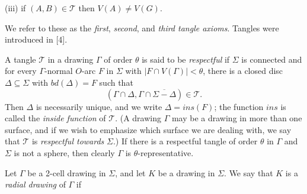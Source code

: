 \hspace*{12pt}(iii) if $(A, B) \in \mathscr{T}$ then $V(A) \ne V(G)$.

We refer to these as the \textit{first}, \textit{second}, and \textit{third tangle axioms}. Tangles were introduced in [4].

A tangle $\mathscr{T}$ in a drawing $\Gamma$ of order $\theta$ is said to be \textit{respectful} if $\Sigma$ is connected and for every $\Gamma$-normal $O$-arc $F$ in $\Sigma$ with $|F \cap V(\Gamma)| < \theta$, there is a closed disc $\Delta \subseteq \Sigma$ with $bd(\Delta) = F$ such that
\begin{equation*}
(\Gamma \cap \Delta, \Gamma \cap \overline{\Sigma - \Delta}) \in \mathscr{T}.
\end{equation*}
Then $\Delta$ is necessarily unique, and we write $\Delta = ins(F)$; the function $ins$ is called the \textit{inside function} of $\mathscr{T}$. (A drawing $\Gamma$ may be a drawing in more than one surface, and if we wish to emphasize which surface we are dealing with, we say that $\mathscr{T}$ is \textit{respectful towards} $\Sigma$.) If there is a respectful tangle of order $\theta$ in $\Gamma$ and $\Sigma$ is not a sphere, then clearly $\Gamma$ is $\theta$-representative.

Let $\Gamma$ be a 2-cell drawing in $\Sigma$, and let $K$ be a drawing in $\Sigma$. We say that $K$ is a \textit{radial drawing} of $\Gamma$ if
